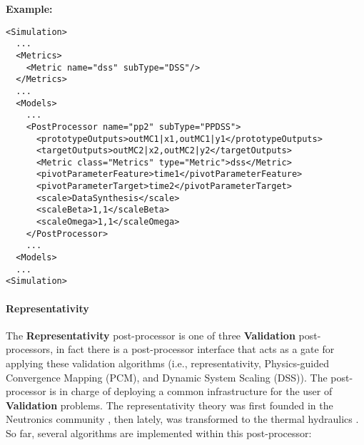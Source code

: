 \textbf{Example:}
\begin{lstlisting}[style=XML,morekeywords={subType}]
<Simulation>
  ...
  <Metrics>
    <Metric name="dss" subType="DSS"/>
  </Metrics>
  ...
  <Models>
    ...
    <PostProcessor name="pp2" subType="PPDSS">
      <prototypeOutputs>outMC1|x1,outMC1|y1</prototypeOutputs>
      <targetOutputs>outMC2|x2,outMC2|y2</targetOutputs>
      <Metric class="Metrics" type="Metric">dss</Metric>
      <pivotParameterFeature>time1</pivotParameterFeature>
      <pivotParameterTarget>time2</pivotParameterTarget>
      <scale>DataSynthesis</scale>
      <scaleBeta>1,1</scaleBeta>
      <scaleOmega>1,1</scaleOmega>
    </PostProcessor>
    ...
  <Models>
  ...
<Simulation>
\end{lstlisting}

\paragraph{Representativity}
The \textbf{Representativity} post-processor is one of three \textbf{Validation} post-processors, in fact there is a
post-processor interface that acts as a gate for applying these validation algorithms
(i.e., representativity, Physics-guided Convergence Mapping (PCM), and Dynamic System Scaling (DSS)).
The post-processor is in charge of deploying a common infrastructure for the user of  \textbf{Validation} problems.
The representativity theory was first founded in the
Neutronics community \cite{Gandini, palmiotti1, palmiotti2}, then lately, was transformed to the thermal hydraulics \cite{Epiney1, Epiney2}. So far, several algorithms are implemented within this post-processor:
%
%

